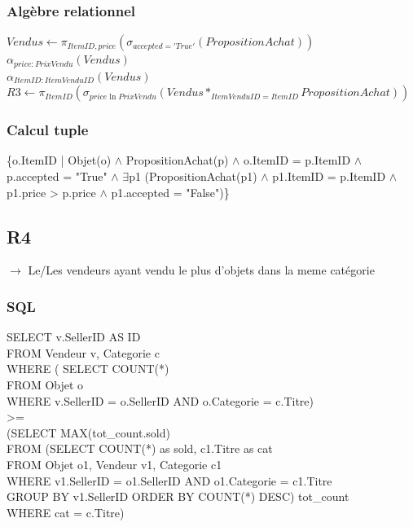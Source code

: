 \documentclass[a4paper,11pt]{article}
\begin{document}
\subsubsection{Algèbre relationnel}

$Vendus \leftarrow \pi_{ItemID, price}(\sigma_{accepted='True'}(PropositionAchat))$\\
$\alpha_{price:PrixVendu}(Vendus)$\\
$\alpha_{ItemID:ItemVenduID}(Vendus)$\\
$R3 \leftarrow \pi_{ItemID}(\sigma_{price \ln PrixVendu}(Vendus*_{ItemVenduID=ItemID}PropositionAchat)) $

\subsubsection{Calcul tuple}

\{o.ItemID | Objet(o) $\land$ PropositionAchat(p) $\land$ o.ItemID = p.ItemID $\land$ p.accepted = "True" $\land$ $\exists$p1 (PropositionAchat(p1) $\land$ p1.ItemID = p.ItemID $\land$ p1.price > p.price $\land$ p1.accepted = "False")\}
\subsection{R4}

$\rightarrow$ Le/Les vendeurs ayant vendu le plus d'objets dans la meme catégorie

\subsubsection{SQL}

SELECT v.SellerID AS ID\\
FROM Vendeur v, Categorie c \\
WHERE ( SELECT COUNT(*)\\
\indent \indent FROM Objet o\\
\indent \indent WHERE v.SellerID = o.SellerID AND o.Categorie = c.Titre)\\

\indent \indent >=\\

\indent \indent (SELECT MAX(tot\_count.sold)\\
\indent \indent FROM (SELECT COUNT(*) as sold, c1.Titre as cat \\
\indent \indent \indent \indent FROM Objet o1, Vendeur v1, Categorie c1 \\
\indent \indent \indent \indent WHERE v1.SellerID = o1.SellerID AND o1.Categorie = c1.Titre \\
\indent \indent GROUP BY v1.SellerID ORDER BY COUNT(*) DESC) tot\_count \\
\indent \indent WHERE cat = c.Titre)
\end{document}
